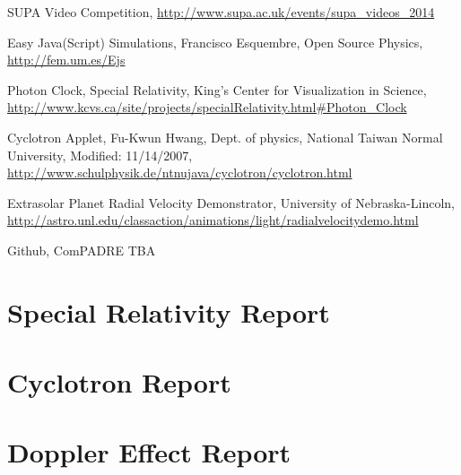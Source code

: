 \documentclass[11pt]{article}
\begin{document}
\newpage
\begin{thebibliography}{1}

  SUPA Video Competition,
  \url{http://www.supa.ac.uk/events/supa_videos_2014}

  Easy Java(Script) Simulations,
  Francisco Esquembre,
  Open Source Physics,
  \url{http://fem.um.es/Ejs}

  Photon Clock,
  Special Relativity,
  King's Center for Visualization in Science,
  \url{http://www.kcvs.ca/site/projects/specialRelativity.html#Photon_Clock}

  Cyclotron Applet,
  Fu-Kwun Hwang,
  Dept. of physics,
  National Taiwan Normal University,
  Modified: 11/14/2007,
  \url{http://www.schulphysik.de/ntnujava/cyclotron/cyclotron.html}

  Extrasolar Planet Radial Velocity Demonstrator,
  University of Nebraska-Lincoln,  \url{http://astro.unl.edu/classaction/animations/light/radialvelocitydemo.html}

  Github, ComPADRE TBA

\end{thebibliography}

\newpage
\appendix
\section{Special Relativity Report}


\newpage
\section{Cyclotron Report}


\newpage
\section{Doppler Effect Report}

\end{document}
